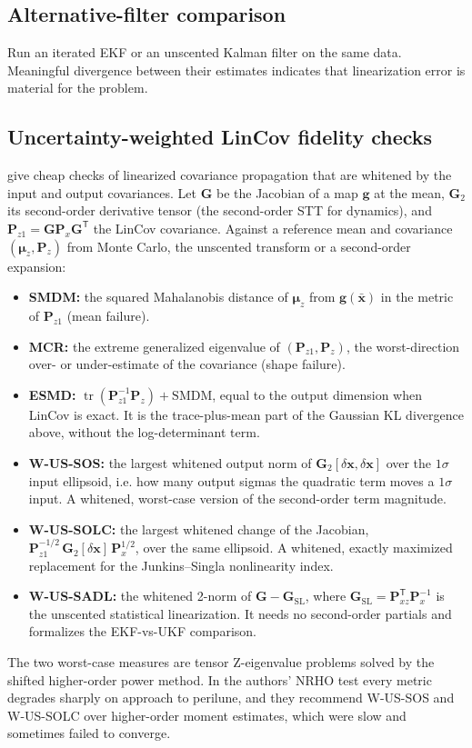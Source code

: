 \documentclass[11pt]{article}
\newcommand{\x}{\bm{x}}
\newcommand{\Pm}{\bm{P}}
\newcommand{\T}{^{\mathsf{T}}}
\begin{document}
\subsection{Alternative-filter comparison}
Run an iterated EKF or an unscented Kalman filter on the same data. Meaningful divergence
between their estimates indicates that linearization error is material for the problem.

\subsection{Uncertainty-weighted LinCov fidelity checks}
\label{sec:lincov_fidelity}
\textcite{kulik2025} give cheap checks of linearized covariance propagation that are
whitened by the input and output covariances. Let $\bm{G}$ be the Jacobian of a map
$\bm{g}$ at the mean, $\bm{G}_2$ its second-order derivative tensor (the second-order STT
for dynamics), and $\Pm_{z1} = \bm{G}\Pm_x\bm{G}\T$ the LinCov covariance. Against a
reference mean and covariance $(\bm{\mu}_z, \Pm_z)$ from Monte Carlo, the unscented
transform or a second-order expansion:
\begin{itemize}
  \item \textbf{SMDM:} the squared Mahalanobis distance of $\bm{\mu}_z$ from
        $\bm{g}(\bar{\x})$ in the metric of $\Pm_{z1}$ (mean failure).
  \item \textbf{MCR:} the extreme generalized eigenvalue of $(\Pm_{z1}, \Pm_z)$, the
        worst-direction over- or under-estimate of the covariance (shape failure).
  \item \textbf{ESMD:} $\operatorname{tr}(\Pm_{z1}^{-1}\Pm_z) + \mathrm{SMDM}$, equal to the
        output dimension when LinCov is exact. It is the trace-plus-mean part of the
        Gaussian KL divergence above, without the log-determinant term.
  \item \textbf{W-US-SOS:} the largest whitened output norm of $\bm{G}_2[\delta\x,\delta\x]$
        over the $1\sigma$ input ellipsoid, i.e. how many output sigmas the quadratic term
        moves a $1\sigma$ input. A whitened, worst-case version of the second-order term
        magnitude.
  \item \textbf{W-US-SOLC:} the largest whitened change of the Jacobian,
        $\Pm_{z1}^{-1/2}\,\bm{G}_2[\delta\x]\,\Pm_x^{1/2}$, over the same ellipsoid. A
        whitened, exactly maximized replacement for the Junkins--Singla nonlinearity index.
  \item \textbf{W-US-SADL:} the whitened 2-norm of $\bm{G} - \bm{G}_{\mathrm{SL}}$, where
        $\bm{G}_{\mathrm{SL}} = \Pm_{xz}\T\Pm_x^{-1}$ is the unscented statistical
        linearization. It needs no second-order partials and formalizes the EKF-vs-UKF
        comparison.
\end{itemize}
The two worst-case measures are tensor Z-eigenvalue problems solved by the shifted
higher-order power method. In the authors' NRHO test every metric degrades sharply on
approach to perilune, and they recommend W-US-SOS and W-US-SOLC over higher-order moment
estimates, which were slow and sometimes failed to converge.
\end{document}

